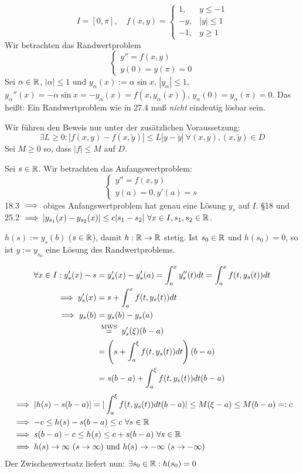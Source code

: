 \documentclass{article}
\begin{document}
\begin{beispiel}
\[I = [0,\pi], \quad
f(x,y) = \begin{cases} 1,&y\le -1\\ -y,&|y|\le 1\\ -1,&y\ge 1\end{cases}\]
Wir betrachten das Randwertproblem
\[ \begin{cases} y'' = f(x,y) \\ y(0) = y(\pi) = 0 \end{cases} \]
Sei $\alpha \in \mathbb{R}$, $|\alpha|\le 1$ und $y_\alpha(x) := \alpha \sin x$, $|y_\alpha| \le 1$, $y_\alpha''(x) = - \alpha \sin x = - y_\alpha(x) = f(x,y_\alpha(x))$, $y_\alpha(0) = y_\alpha(\pi) = 0$. Das heißt: Ein Randwertproblem wie in 27.4 muß \emph{nicht} eindeutig lösbar sein.
\end{beispiel}

\begin{beweis}
Wir führen den Beweis nur unter der zusätzlichen Voraussetzung:
\[\exists L \ge 0: |f(x,y) - f(x,\tilde y)| \le L|y-\tilde y| \ \forall(x,y),(x,\tilde y)\in D\]
Sei $M\ge 0$ so, dass $|f|\le M$ auf $D$.

Sei $s\in\mathbb{R}$. Wir betrachten das Anfangswertproblem:
\[ \begin{cases} y'' = f(x,y) \\ y(a) =  0 , y'(a) = s \end{cases} \]
18.3 $\implies$ obiges Anfangswertproblem hat genau eine Lösung $y_s$ auf $I$. §18 und 25.2 $\implies |y_{s_1}(x) - y_{s_2}(x)| \le c |s_1 - s_2 | \ \forall x\in I, s_1,s_2\in \mathbb{R}$.

$h(s) := y_s(b)$ ($s\in\mathbb{R}$), damit $h:\mathbb{R}\to\mathbb{R}$ stetig. Ist $s_0\in\mathbb{R}$ und $h(s_0) = 0$, so ist $y:=y_{s_0}$ eine Lösung des Randwertproblems.

\begin{align*}
\forall x\in I: y_s'(x) - s &= y_s'(x) -y'_s(a) = \int_a^xy_s''(t)dt = \int_a^xf(t,y_s(t))dt\\
\folgt y_s'(x) &= s+ \int_a^x f(t,y_s(t))dt\\
\folgt y_s(b) &= y_s(b) - y_s(a) \\
&\gleichnach{MWS} y_s'(\xi)(b-a) \\
&= \left(s + \int_a^\xi f(t,y_s(t))dt\right)(b-a)\\
&= s(b-a) + \int_a^\xi f(t,y_s(t))dt (b-a) \\
\end{align*}
\begin{align*}
&\folgt |h(s) - s(b-a)| = |\int_a^\xi f(t,y_s(t))dt(b-a)|\le M(\xi - a) \le M(b-a) =: c\\
&\folgt -c \le h(s)-s(b-a) \le c \ \forall s\in\MdR\\
&\folgt s(b-a) -c \le h(s) \le c+s(b-a) \ \forall s\in\MdR\\
&\folgt h(s) \to \infty \ (s\to\infty)\text{ und }h(s) \to -\infty \ (s\to-\infty)
\end{align*}
Der Zwischenwertsatz liefert nun: $\exists s_0 \in\mathbb{R}: h(s_0) = 0$
\end{beweis}
\end{document}
